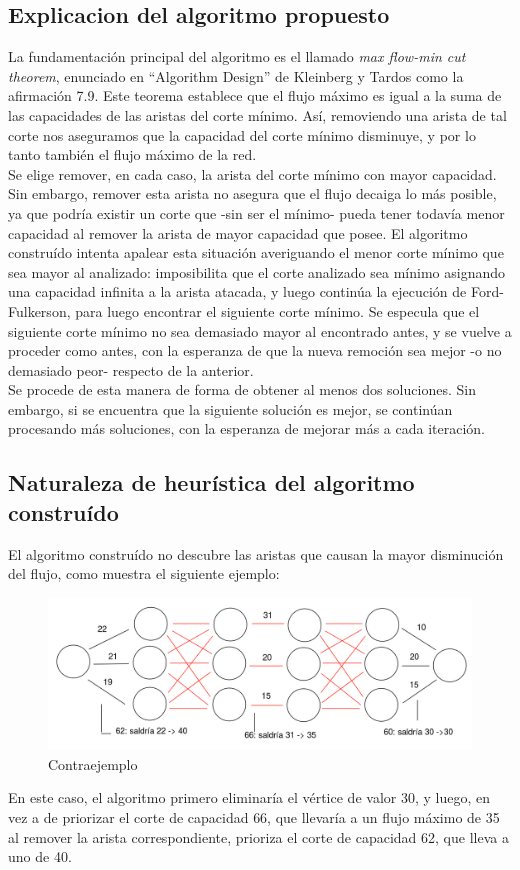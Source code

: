 \documentclass{article}
\begin{document}
\subsection{Explicacion del algoritmo propuesto}
La fundamentación principal del algoritmo es el llamado \textit{max flow-min cut theorem}, enunciado en ``Algorithm Design'' de Kleinberg y Tardos como la afirmación 7.9. Este teorema establece que el flujo máximo es igual a la suma de las capacidades de las aristas del corte mínimo. Así, removiendo una arista de tal corte nos aseguramos que la capacidad del corte mínimo disminuye, y por lo tanto también el flujo máximo de la red.\\
Se elige remover, en cada caso, la arista del corte mínimo con mayor capacidad. Sin embargo, remover esta arista no asegura que el flujo decaiga lo más posible, ya que podría existir un corte que -sin ser el mínimo- pueda tener todavía menor capacidad al remover la arista de mayor capacidad que posee. El algoritmo construído intenta apalear esta situación averiguando el menor corte mínimo que sea mayor al analizado: imposibilita que el corte analizado sea mínimo asignando una capacidad infinita a la arista atacada, y luego continúa la ejecución de Ford-Fulkerson, para luego encontrar el siguiente corte mínimo. Se especula que el siguiente corte mínimo no sea demasiado mayor al encontrado antes, y se vuelve a proceder como antes, con la esperanza de que la nueva remoción sea mejor -o no demasiado peor- respecto de la anterior.\\
Se procede de esta manera de forma de obtener al menos dos soluciones. Sin embargo, si se encuentra que la siguiente solución es mejor, se continúan procesando más soluciones, con la esperanza de mejorar más a cada iteración.\\

\subsection{Naturaleza de heurística del algoritmo construído}
El algoritmo construído no descubre las aristas que causan la mayor disminución del flujo, como muestra el siguiente ejemplo:
\begin{figure}[H]
    \centering
    \includegraphics[scale=0.3]{res/contraejemplo.png}
    \caption{Contraejemplo}
\end{figure}
En este caso, el algoritmo primero eliminaría el vértice de valor 30, y luego, en vez a de priorizar el corte de capacidad 66, que llevaría a un flujo máximo de 35 al remover la arista correspondiente, prioriza el corte de capacidad 62, que lleva a uno de 40.
\end{document}

